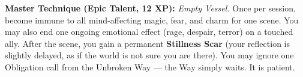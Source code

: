 \begin{tcolorbox}[colback=black!5,colframe=blue!60!black,title=\textbf{Still-Point (The Unbroken Way)},breakable]
  \vspace{2mm}
  \noindent\textbf{Master Technique (Epic Talent, 12 XP):}
  \textit{Empty Vessel.} Once per session, become immune to all mind-affecting magic, fear, and charm for one scene. You may also end one ongoing emotional effect (rage, despair, terror) on a touched ally. After the scene, you gain a permanent \textbf{Stillness Scar} (your reflection is slightly delayed, as if the world is not sure you are there). You may ignore one Obligation call from the Unbroken Way --- the Way simply waits. It is patient.
\end{tcolorbox}